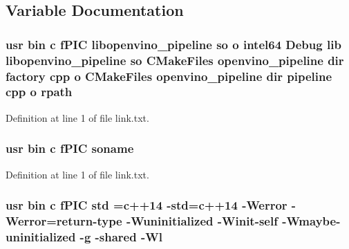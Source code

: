\subsection{Variable Documentation}
\subsubsection[{\texorpdfstring{rpath}{rpath}}]{\setlength{\rightskip}{0pt plus 5cm}usr bin {\bf c} f\+P\+IC libopenvino\+\_\+pipeline {\bf so} o intel64 Debug lib libopenvino\+\_\+pipeline {\bf so} C\+Make\+Files openvino\+\_\+pipeline dir factory cpp o C\+Make\+Files openvino\+\_\+pipeline dir pipeline cpp o rpath}\hypertarget{lib_2CMakeFiles_2openvino__pipeline_8dir_2link_8txt_a3504e61d939c00da84a47a0afd2fc405}{}\label{lib_2CMakeFiles_2openvino__pipeline_8dir_2link_8txt_a3504e61d939c00da84a47a0afd2fc405}


Definition at line 1 of file link.\+txt.

\subsubsection[{\texorpdfstring{soname}{soname}}]{\setlength{\rightskip}{0pt plus 5cm}usr bin {\bf c} f\+P\+IC soname}\hypertarget{lib_2CMakeFiles_2openvino__pipeline_8dir_2link_8txt_ab65a9b6457c4853ed17f89f945516e66}{}\label{lib_2CMakeFiles_2openvino__pipeline_8dir_2link_8txt_ab65a9b6457c4853ed17f89f945516e66}


Definition at line 1 of file link.\+txt.

\subsubsection[{\texorpdfstring{std}{std}}]{\setlength{\rightskip}{0pt plus 5cm}usr bin {\bf c} f\+P\+IC std ={\bf c}++14 -\/std={\bf c}++14 -\/Werror -\/Werror=return-\/type -\/Wuninitialized -\/Winit-\/self -\/Wmaybe-\/uninitialized -\/g -\/shared -\/{\bf Wl}}\hypertarget{lib_2CMakeFiles_2openvino__pipeline_8dir_2link_8txt_a5f87c8f8e33670f7c8c5221b6be1bcc4}{}\label{lib_2CMakeFiles_2openvino__pipeline_8dir_2link_8txt_a5f87c8f8e33670f7c8c5221b6be1bcc4}


